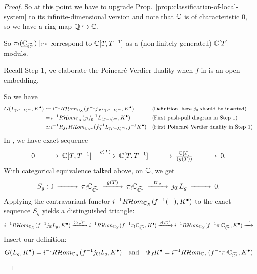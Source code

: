 \begin{proof}
    So at this point we have to upgrade Prop.~\ref{prop:classification-of-local-system} to its infinite-dimensional
    version \cite[Proposition~1.7]{ElZeinSnoussi2009LocalSystems}
    and note that $\mathbb{C}$ is of characteristic $0$, so we have a ring map $\mathbb{Q}\hookrightarrow\mathbb{C}$.

    So $\pi_!(\underline{\mathbb{C}}_{\widetilde{\mathbb{C}^*}})\mid_{\mathbb{C}^*}$ correspond to $\mathbb{C}[T, T^{-1}]$ as a (non-finitely generated) $\mathbb{C}[T]$-module.

    Recall Step 1, we elaborate the Poincar\'e Verdier duality when $f$ in \cite[Thm.~3.10]{KashiwaraSchapira1994Sheaves} is an open embedding.

    So we have
    \begin{align*}
        G(L_{(T-\lambda)^m}, {K^\bullet}) & := i^{-1}R\mathcal{H}om_{\mathbb{C}_{{X}}}(f^{-1}j_{0!}L_{(T-\lambda)^m},K^\bullet)              &  & \text{(Definition, here $j_0$ should be inserted)}  \\
                                & = i^{-1}R\mathcal{H}om_{\mathbb{C}_{{X}}}(j_!f_0^{-1}L_{(T-\lambda)^m},K^\bullet)                &  & \text{(First push-pull diagram in Step 1)}          \\
                                & \simeq i^{-1}Rj_* R\mathcal{H}om_{\mathbb{C}_{{X^*}}}(f_0^{-1}L_{(T-\lambda)^m},j^{-1}K^\bullet) &  & \text{(First Poincar\'e Verdier duality in Step 1)}
    \end{align*}
    In \cite[Lemma~3.9]{Wu2017NearbyVanishingCycles}, we have exact sequence
    \[
        \begin{CD}
            0@>>>\C[T,T^{-1}]@>g(T)>>\C[T,T^{-1}] @>>>\frac{\C[T]}{(g(T))}@>>>0.
        \end{CD}
    \]
    With categorical equivalence talked above, on $\mathbb{C}$, we get
    \[
        \begin{CD}
            S_g: 0@>>>\pi_!\C_{\widetilde{\C^*}}@>g(T)>>\pi_!\C_{\widetilde{\C^*}} @>tr_g>>j_{0!} L_g @>>>0.
        \end{CD}
    \]
    Applying the contravariant functor $i^{-1}R\mathcal{H}om_{\mathbb{C}_{{X}}}(f^{-1}(-), K^\bullet)$ to the exact sequence $S_g$ yields a distinguished triangle:
    \[
        i^{-1}R\mathcal{H}om_{\mathbb{C}_{{X}}}(f^{-1} j_{0!} L_g, K^\bullet) \xrightarrow{(tr_g)^*} i^{-1}R\mathcal{H}om_{\mathbb{C}_{{X}}}(f^{-1}\pi_!\mathbb{C}_{\widetilde{\mathbb{C}^*}}, K^\bullet) \xrightarrow{g(T)^*} i^{-1}R\mathcal{H}om_{\mathbb{C}_{{X}}}(f^{-1}\pi_!\mathbb{C}_{\widetilde{\mathbb{C}^*}}, K^\bullet) \xrightarrow{+1}
    \]
    Insert our definition:
    \[
        G(L_g, {K^\bullet}) = i^{-1}R\mathcal{H}om_{\mathbb{C}_{{X}}}(f^{-1} j_{0!} L_g, K^\bullet) \quad \text{and} \quad \Psi_f K^\bullet = i^{-1}R\mathcal{H}om_{\mathbb{C}_{{X}}}(f^{-1}\pi_!\mathbb{C}_{\widetilde{\mathbb{C}^*}}, K^\bullet)
\]
\end{proof}
